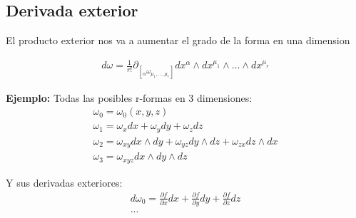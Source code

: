 \documentclass{article}
\newcommand{\caja}[3]{%
  \begin{tcolorbox}[colback=#1!5!white,colframe=#1!25!black,title=#2]
    #3
  \end{tcolorbox}%
}
\begin{document}
\subsection{Derivada exterior }
El producto exterior nos va a aumentar el grado de la forma en una dimension 
\caja{red}{Derivada exterior }{
  \begin{gather*}
    d \omega  = \frac{1}{r! } \partial _{[_\alpha\omega _{\mu_1,\dots, \mu_r } ]}dx ^ {\alpha } \land dx ^ {\mu_1 } \land \dots\land dx ^ {\mu_r }
  \end{gather*}
}
\textbf{Ejemplo: } Todas las posibles r-formas en 3 dimensiones: 
\begin{gather*}
  \omega_0 = \omega_0 (x,y,z) \\
  \omega_1 = \omega_x dx + \omega_y dy + \omega_z dz\\
  \omega_2 = \omega _{xy } dx \land dy + \omega _{yz } dy \land dz + \omega _{zx } dz \land dx \\
  \omega_3 = \omega _{xyz } dx \land dy \land dz 
\end{gather*}

Y sus derivadas exteriores: 
\begin{gather*}
  d \omega_0 = \frac{\partial f  }{\partial x } dx + \frac{\partial f  }{\partial  y }dy  + \frac{\partial f  }{\partial  z } dz \\
  ...
\end{gather*}
\end{document}

